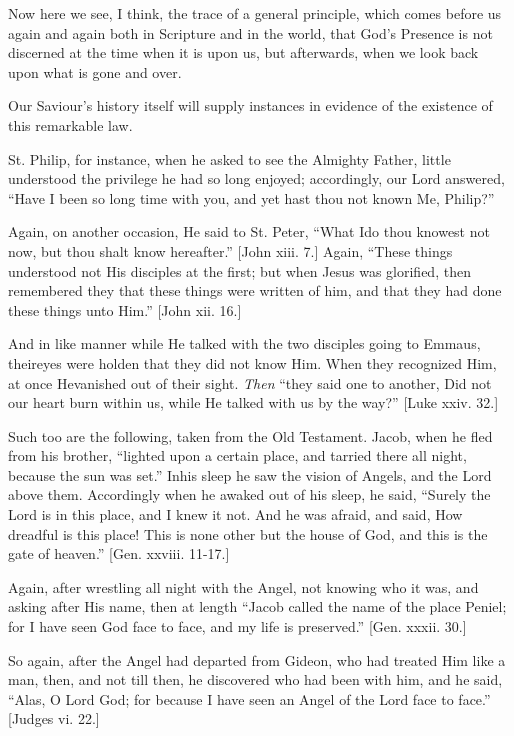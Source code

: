 Now here we see, I think, the trace of a general principle, which
comes before us again and again both in Scripture and in the world,
that God's Presence is not discerned at the time when it is upon us,
but afterwards, when we look back upon what is gone and over.

Our Saviour's history itself will supply instances in evidence of
the existence of this remarkable law.

St. Philip, for instance, when he asked to see the Almighty Father,
little understood the privilege he had so long enjoyed; accordingly,
our Lord answered, ``Have I been so long time with you, and yet
hast thou not known Me, Philip?''

Again, on another occasion, He said to St. Peter, ``What I\emph{}do
thou knowest not now, but thou shalt know hereafter.'' [John xiii.
7.] Again, ``These things understood not His disciples at the
first; but when Jesus was glorified, then remembered they that these
things were written of him, and that they had done these things unto
Him.'' [John xii. 16.]

And in like manner while He talked with the two disciples going to
Emmaus, their\emph{}eyes were holden that they did not know Him. When
they recognized Him, at once He\emph{}vanished out of their sight. \emph{Then}
``they said one to another, Did not our heart burn within us,
while He talked with us by the way?'' [Luke xxiv. 32.]

Such too are the following, taken from the Old Testament. Jacob,
when he fled from his brother, ``lighted upon a certain place, and
tarried there all night, because the sun was set.'' In\emph{}his
sleep he saw the vision of Angels, and the Lord above them.
Accordingly when he awaked out of his sleep, he said, ``Surely the
Lord is in this place, and I knew it not. And he was afraid, and said,
How dreadful is this place! This is none other but the house of God,
and this is the gate of heaven.'' [Gen. xxviii. 11-17.]

Again, after wrestling all night with the Angel, not knowing who it
was, and asking after His name, then at length ``Jacob called the
name of the place Peniel; for I have seen God face to face, and my
life is preserved.'' [Gen. xxxii. 30.]

So again, after the Angel had departed from Gideon, who had treated
Him like a man, then, and not till then, he discovered who had been
with him, and he said, ``Alas, O Lord God; for because I have seen
an Angel of the Lord face to face.'' [Judges vi. 22.]

